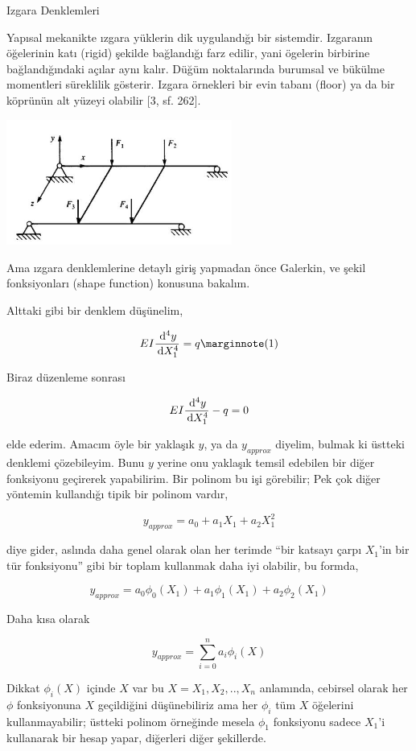 \documentclass[12pt,fleqn]{article}\usepackage{../../common}
\begin{document}
Izgara Denklemleri

Yapısal mekanikte ızgara yüklerin dik uygulandığı bir sistemdir. Izgaranın
öğelerinin katı (rigid) şekilde bağlandığı farz edilir, yani ögelerin birbirine
bağlandığındaki açılar aynı kalır. Düğüm noktalarında burumsal ve bükülme
momentleri süreklilik gösterir. Izgara örnekleri bir evin tabanı (floor) ya da
bir köprünün alt yüzeyi olabilir [3, sf. 262].

\includegraphics[width=20em]{compscieng_bpp43fem_01.jpg}

Ama ızgara denklemlerine detaylı giriş yapmadan önce Galerkin, ve şekil
fonksiyonları (shape function) konusuna bakalım.

Alttaki gibi bir denklem düşünelim,

$$
E I \frac{\ud^4 y}{\ud X_1^4} = q
\mlabel{1}
$$

Biraz düzenleme sonrası

$$
E I \frac{\,\mathrm{d}^4 y}{\,\mathrm{d} X_1^4} - q = 0
$$

elde ederim. Amacım öyle bir yaklaşık $y$, ya da $y_{approx}$ diyelim, bulmak ki
üstteki denklemi çözebileyim. Bunu $y$ yerine onu yaklaşık temsil edebilen bir
diğer fonksiyonu geçirerek yapabilirim. Bir polinom bu işi görebilir; Pek çok
diğer yöntemin kullandığı tipik bir polinom vardır,

$$
y_{approx} = a_0 + a_1 X_1 + a_2 X_1^2 
$$

diye gider, aslında daha genel olarak olan her terimde ``bir katsayı çarpı
$X_1$'in bir tür fonksiyonu'' gibi bir toplam kullanmak daha iyi olabilir,
bu formda,

$$
y_{approx} = a_0 \phi_0(X_1) + a_1 \phi_1(X_1) + a_2 \phi_2(X_1) 
$$

Daha kısa olarak

$$
y_{approx} = \sum_{i=0}^{n} a_i \phi_i(X) 
$$

Dikkat $\phi_i(X)$ içinde $X$ var bu $X = X_1,X_2,..,X_n$ anlamında, cebirsel
olarak her $\phi$ fonksiyonuna $X$ geçildiğini düşünebiliriz ama her $\phi_i$
tüm $X$ öğelerini kullanmayabilir; üstteki polinom örneğinde mesela $\phi_1$
fonksiyonu sadece $X_1$'i kullanarak bir hesap yapar, diğerleri diğer şekillerde.
\end{document}

